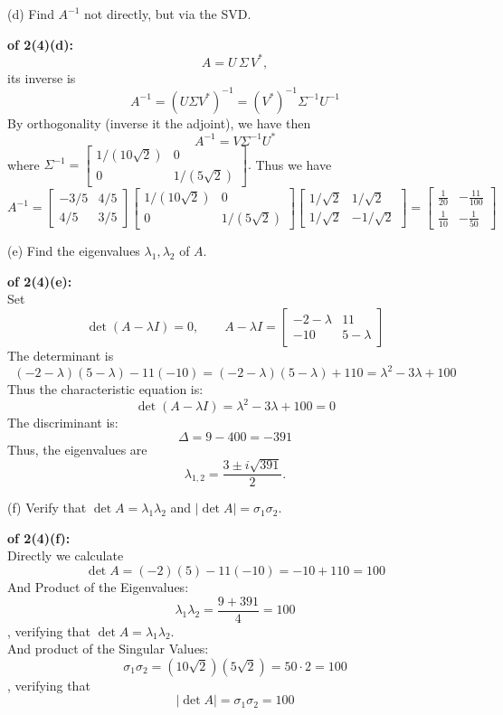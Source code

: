 \documentclass[lang=cn,11pt]{elegantbook}
\begin{document}
    (d) Find $A^{-1}$ not directly, but via the SVD.
    \begin{solution}
        \textbf{of 2(4)(d):}\\
\[
A=U\,\Sigma\,V^*,
\]
its inverse is
$$
A^{-1} = (U\Sigma V^*)^{-1} = (V^*)^{-1} \Sigma^{-1} U^{-1}
$$
By orthogonality (inverse it the adjoint), we have then
$$
A^{-1} = V  \Sigma^{-1}U^*
$$
where \(
\Sigma^{-1}=\begin{bmatrix}1/(10\sqrt2)&0\\[1mm]0&1/(5\sqrt2)\end{bmatrix}.
\) Thus we have
\[
A^{-1}=\begin{bmatrix} -3/5 & 4/5 \\ 4/5 & 3/5 \end{bmatrix}\begin{bmatrix}1/(10\sqrt2)&0\\ 0&1/(5\sqrt2)\end{bmatrix}\begin{bmatrix} 1/\sqrt2 & 1/\sqrt2 \\ 1/\sqrt2 & -1/\sqrt2\end{bmatrix} =  \begin{bmatrix} \frac{1}{20} & -\frac{11}{100} \\[6pt] \frac{1}{10} & -\frac{1}{50} \end{bmatrix}
\]
    \end{solution}

    (e) Find the eigenvalues $\lambda_1, \lambda_2$ of $A$.\\
    \begin{solution}
        \textbf{of 2(4)(e):} \\
Set \[
\det(A-\lambda I)=0,\quad \quad A-\lambda I=\begin{bmatrix} -2-\lambda & 11 \\ -10 & 5-\lambda\end{bmatrix}
\]
The determinant is
\[
(-2-\lambda)(5-\lambda)-11(-10)=(-2-\lambda)(5-\lambda)+110 = \lambda^2-3\lambda + 100
\]
Thus the characteristic equation is:
\[
\det(A-\lambda I)=\lambda^2-3\lambda + 100=0
\]
The discriminant is:
\[
\Delta=9-400 = -391
\]
Thus, the eigenvalues are
\[
\lambda_{1,2}=\frac{3\pm i\sqrt{391}}{2}.
\]
    \end{solution}

    (f) Verify that $\det A = \lambda_1 \lambda_2$ and $\lvert \det A \rvert = \sigma_1 \sigma_2$.
    \begin{solution}
        \textbf{of 2(4)(f):}\\
        Directly we calculate\[
   \det A=(-2)(5)-11(-10)=-10+110=100
   \]
And Product of the Eigenvalues:
   \[
   \lambda_1\lambda_2= \frac{9+391}{4} = 100
   \]
, verifying that $\det A = \lambda_1 \lambda_2$.\\
And product of the Singular Values:\[
   \sigma_1\sigma_2=(10\sqrt2)(5\sqrt2)=50\cdot2=100
   \]
, verifying that
\[
|\det A|=\sigma_1\sigma_2=100
\]
    \end{solution}
\end{document}
